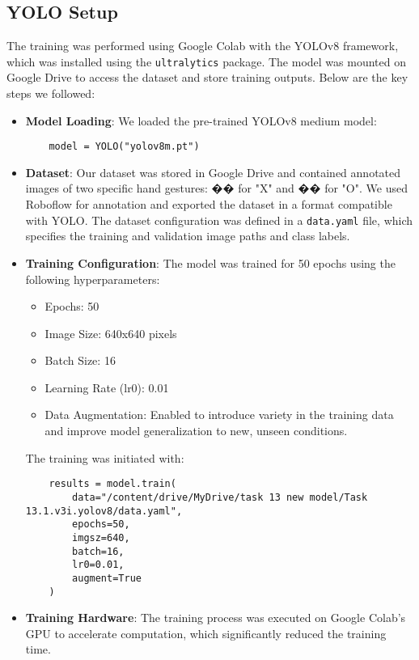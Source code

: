 \documentclass[a4paper,12pt]{article}
\begin{document}
\subsection{YOLO Setup}
The training was performed using Google Colab with the YOLOv8 framework, which was installed using the \texttt{ultralytics} package. The model was mounted on Google Drive to access the dataset and store training outputs. Below are the key steps we followed:
\begin{itemize}
    \item \textbf{Model Loading}: We loaded the pre-trained YOLOv8 medium model:
    \begin{verbatim}
    model = YOLO("yolov8m.pt")
    \end{verbatim}

    \item \textbf{Dataset}: Our dataset was stored in Google Drive and contained annotated images of two specific hand gestures: �� for "X" and �� for "O". We used Roboflow for annotation and exported the dataset in a format compatible with YOLO. The dataset configuration was defined in a \texttt{data.yaml} file, which specifies the training and validation image paths and class labels.

    \item \textbf{Training Configuration}: The model was trained for 50 epochs using the following hyperparameters:
    \begin{itemize}
        \item Epochs: 50
        \item Image Size: 640x640 pixels
        \item Batch Size: 16
        \item Learning Rate (lr0): 0.01
        \item Data Augmentation: Enabled to introduce variety in the training data and improve model generalization to new, unseen conditions.
    \end{itemize}

    The training was initiated with:
    \begin{verbatim}
    results = model.train(
        data="/content/drive/MyDrive/task 13 new model/Task 13.1.v3i.yolov8/data.yaml", 
        epochs=50, 
        imgsz=640, 
        batch=16, 
        lr0=0.01, 
        augment=True
    )
    \end{verbatim}
    
    \item \textbf{Training Hardware}: The training process was executed on Google Colab's GPU to accelerate computation, which significantly reduced the training time.
\end{itemize}
\end{document}
